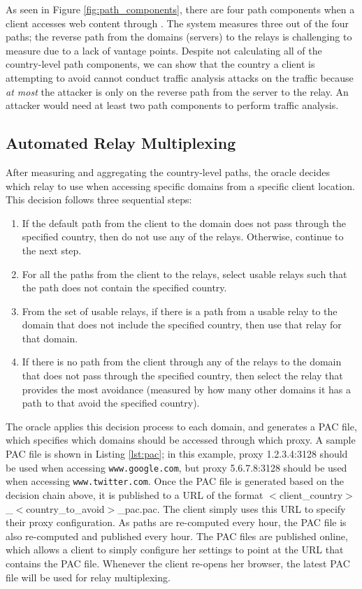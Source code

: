 As seen in Figure \ref{fig:path_components}, there are four path components 
when a client accesses web content through \system{}.  The system measures three 
out of the four paths; the reverse path from the domains (servers) to the relays 
is challenging to measure due to a lack of vantage points.  Despite not 
calculating all of the country-level path components, we can show that the 
country a client is attempting to avoid cannot conduct traffic analysis attacks 
on the traffic because {\it at most} the attacker is only on the reverse path 
from the server to the relay.  An attacker would need at least two path 
components to perform traffic analysis. 

\subsection{Automated Relay Multiplexing}
\label{multiplex}
After measuring and aggregating the country-level paths, the oracle decides 
which relay to use when accessing specific domains from a specific client 
location.  This decision follows three sequential steps:

\begin{enumerate}
\item If the default path from the client to the domain does not pass through 
the specified country, then do not use any of the relays. Otherwise, continue 
to the next step.
\item For all the paths from the client to the relays, select usable relays 
such that the path does not contain the specified country.
\item From the set of usable relays, if there is a path from a 
usable relay to the domain that does not include the specified country, then 
use that relay for that domain.
\item If there is no path from the client through any of the relays to the domain 
that does not pass through the specified country, then select the relay 
that provides the most avoidance (measured by how many other domains it has 
a path to that avoid the specified country).
\end{enumerate}

The oracle applies this decision process to each domain, and generates a PAC 
file, which specifies which domains should be accessed through which proxy.  A 
sample PAC file is shown in Listing \ref{lst:pac}; in this example, proxy 
1.2.3.4:3128 should be used when accessing {\tt www.google.com}, but proxy 
5.6.7.8:3128 should be used when accessing {\tt www.twitter.com}.  Once the PAC 
file is generated based on the decision chain above, it is published to a URL 
of the format $<$client\_country$>$\_$<$country\_to\_avoid$>$\_pac.pac.  The client 
simply uses this URL to specify their proxy configuration.  As paths are re-computed 
every hour, the PAC file is also re-computed and published every hour.  The PAC files 
are published online, which allows a client to simply configure her settings to 
point at the URL that contains the PAC file.  Whenever the client re-opens her 
browser, the latest PAC file will be used for relay multiplexing.

